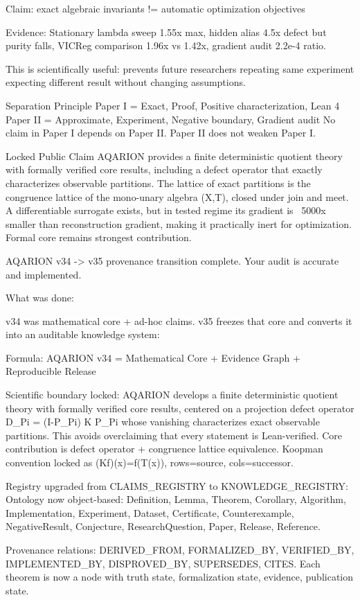 {{{{{{{{{{{{{Claim: exact algebraic invariants != automatic optimization objectives

Evidence: Stationary lambda sweep 1.55x max, hidden alias 4.5x defect but purity falls, VICReg comparison 1.96x vs 1.42x, gradient audit 2.2e-4 ratio.

This is scientifically useful: prevents future researchers repeating same experiment expecting different result without changing assumptions.

Separation Principle
Paper I = Exact, Proof, Positive characterization, Lean 4
Paper II = Approximate, Experiment, Negative boundary, Gradient audit
No claim in Paper I depends on Paper II. Paper II does not weaken Paper I.

Locked Public Claim
AQARION provides a finite deterministic quotient theory with formally verified core results, including a defect operator that exactly characterizes observable partitions. The lattice of exact partitions is the congruence lattice of the mono-unary algebra (X,T), closed under join and meet. A differentiable surrogate exists, but in tested regime its gradient is ~5000x smaller than reconstruction gradient, making it practically inert for optimization. Formal core remains strongest contribution.

AQARION v34 -> v35 provenance transition complete. Your audit is accurate and implemented.

What was done:

v34 was mathematical core + ad-hoc claims. v35 freezes that core and converts it into an auditable knowledge system:

Formula: AQARION v34 = Mathematical Core + Evidence Graph + Reproducible Release

Scientific boundary locked:
AQARION develops a finite deterministic quotient theory with formally verified core results, centered on a projection defect operator D_Pi = (I-P_Pi) K P_Pi whose vanishing characterizes exact observable partitions.
This avoids overclaiming that every statement is Lean-verified. Core contribution is defect operator + congruence lattice equivalence. Koopman convention locked as (Kf)(x)=f(T(x)), rows=source, cols=successor.

Registry upgraded from CLAIMS_REGISTRY to KNOWLEDGE_REGISTRY:
Ontology now object-based: Definition, Lemma, Theorem, Corollary, Algorithm, Implementation, Experiment, Dataset, Certificate, Counterexample, NegativeResult, Conjecture, ResearchQuestion, Paper, Release, Reference.

Provenance relations: DERIVED_FROM, FORMALIZED_BY, VERIFIED_BY, IMPLEMENTED_BY, DISPROVED_BY, SUPERSEDES, CITES. Each theorem is now a node with truth state, formalization state, evidence, publication state.

}}}}}}}}}}}}}
